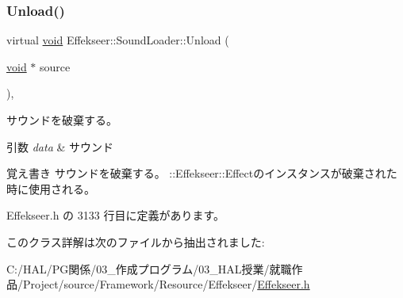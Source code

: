 \subsubsection{\texorpdfstring{Unload()}{Unload()}}
{\footnotesize\ttfamily virtual \mbox{\hyperlink{namespace_effekseer_ab34c4088e512200cf4c2716f168deb56}{void}} Effekseer\+::\+Sound\+Loader\+::\+Unload (\begin{DoxyParamCaption}\item[{\mbox{\hyperlink{namespace_effekseer_ab34c4088e512200cf4c2716f168deb56}{void}} $\ast$}]{source }\end{DoxyParamCaption})\hspace{0.3cm}{\ttfamily [inline]}, {\ttfamily [virtual]}}



サウンドを破棄する。 


\begin{DoxyParams}{引数}
{\em data} & サウンド \\
\hline
\end{DoxyParams}
\begin{DoxyNote}{覚え書き}
サウンドを破棄する。 \+::\+Effekseer\+::\+Effectのインスタンスが破棄された時に使用される。 
\end{DoxyNote}


 Effekseer.\+h の 3133 行目に定義があります。



このクラス詳解は次のファイルから抽出されました\+:\begin{DoxyCompactItemize}
\item 
C\+:/\+H\+A\+L/\+P\+G関係/03\+\_\+作成プログラム/03\+\_\+\+H\+A\+L授業/就職作品/\+Project/source/\+Framework/\+Resource/\+Effekseer/\mbox{\hyperlink{_effekseer_8h}{Effekseer.\+h}}\end{DoxyCompactItemize}
